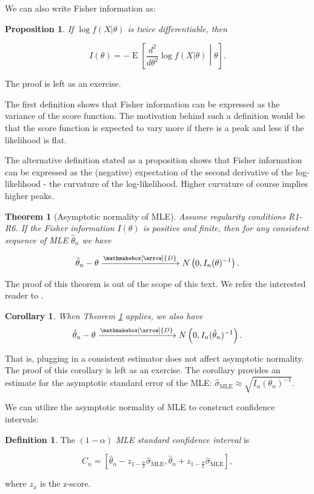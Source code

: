 \documentclass{book}
\theoremstyle{plain}%
\newtheorem{theorem}{Theorem}[section]
\newtheorem{corollary}{Corollary}[section]
\newtheorem{proposition}{Proposition}[section]
\theoremstyle{definition}
\newtheorem{definition}{Definition}[section]
\DeclareMathOperator{\E}{E}
\newlength{\arrow}
\newcommand*{\myrightarrow}[1]{\xrightarrow{\mathmakebox[\arrow]{#1}}}
\begin{document}
We can also write Fisher information as:

\begin{proposition}
If $\log f(X|\theta)$ is twice differentiable, then

$$I(\theta) = -\E\left[\frac{d^2}{d \theta^2} \log f(X|\theta)  \middle| \theta \right].$$\label{prop:fi1}
\end{proposition}

The proof is left as an exercise.

The first definition shows that Fisher information can be expressed as the variance of the score function. The motivation behind such a definition would be that the score function is expected to vary more if there is a peak and less if the likelihood is flat.

The alternative definition stated as a proposition shows that Fisher information can be expressed as the (negative) expectation of the second derivative of the log-likelihood - the curvature of the log-likelihood. Higher curvature of course implies higher peaks.

\begin{theorem}[Asymptotic normality of MLE] Assume regularity conditions R1-R6. If the Fisher information $I(\theta)$ is positive and finite, then for any consistent sequence of MLE $\hat{\theta}_n$ we have

$$\hat{\theta}_n - \theta \myrightarrow{D} N\left(0, I_n(\theta)^{-1}\right).$$\label{thm:normality}
\end{theorem}

The proof of this theorem is out of the scope of this text. We refer the interested reader to \citet[ch. 6.1]{Hogg2005}.

\begin{corollary} When Theorem \ref{thm:normality} applies, we also have
$$\hat{\theta}_n - \theta \myrightarrow{D} N\left(0, I_n(\hat{\theta}_n)^{-1}\right).$$\label{cor:normality}
\end{corollary}

That is, plugging in a consistent estimator does not affect asymptotic normality. The proof of this corollary is left as an exercise. The corollary provides an estimate for the asymptotic standard error of the MLE: $\hat{\sigma}_\text{MLE} \approx \sqrt{I_n(\theta_n)^{-1}}$. 

We can utilize the asymptotic normality of MLE to construct confidence intervals:

\begin{definition} The $(1 - \alpha)$ \emph{MLE standard confidence interval} is 

$$C_n = [\hat{\theta}_n - z_{1 - \frac{\alpha}{2}}\widehat{\sigma}_\text{MLE},\hat{\theta}_n + z_{1 - \frac{\alpha}{2}}\widehat{\sigma}_\text{MLE}],$$

where $z_x$ is the z-score.
\end{definition}
\end{document}
